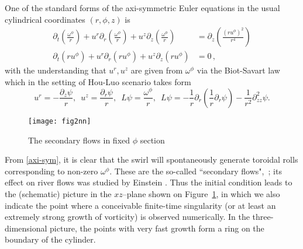 \documentclass[reqno,centertags, 11pt]{amsart}
\newcommand{\om}{\omega}
\begin{document}
One of the standard forms of the axi-symmetric Euler equations in the usual cylindrical coordinates $(r,\phi, z)$ is
\begin{subequations}\label{axi-sym}
\begin{align}
\partial_t \left(\frac{\omega^\phi}{r}\right)+
u^r\partial_r \left(\frac{\omega^\phi}{r}\right) + u^z \partial_z\left(\frac{\omega^\phi}{r}\right) & =\partial_z\left(\frac{(ru^\phi)^2}{r^4}\right)\\
\partial_t (ru^\phi)+u^r \partial_r (ru^\phi)+u^z \partial_z (ru^\phi) & = 0\,,
\end{align}
\end{subequations}
with the understanding that $u^r, u^z$ are given from $\om^\phi$ via the Biot-Savart law %
which in the setting of Hou-Luo scenario takes form
\[ u^r = -\frac{\partial_z \psi}{r}, \,\,\, u^z = \frac{\partial_r \psi}{r}, \,\,\, L\psi = \frac{\omega^\phi}{r}, \,\,\,
L\psi = -\frac1r \partial_r \left( \frac1r \partial_r \psi \right) - \frac{1}{r^2} \partial_{zz}^2 \psi. \]

\begin{figure}\label{secflowsfig}
\begin{center}
\texttt{[image: fig2nn]}
\caption{The secondary flows in fixed $\phi$ section}
\end{center}
\end{figure}

From \eqref{axi-sym}, it is clear that the swirl will spontaneously generate toroidal rolls corresponding to non-zero $\omega^\phi.$
These are the so-called ``secondary flows",~\cite{prandtl}; its effect on river flows was studied by Einstein \cite{einstein}.
Thus the initial condition leads to the (schematic)
picture in the $xz$--plane shown on Figure~\ref{secflowsfig}, in which we also indicate the point where a conceivable
finite-time singularity (or at least an extremely strong growth of vorticity) is observed numerically.
In the three-dimensional picture, the points with very fast growth form a ring on the boundary of the cylinder.
\end{document}
